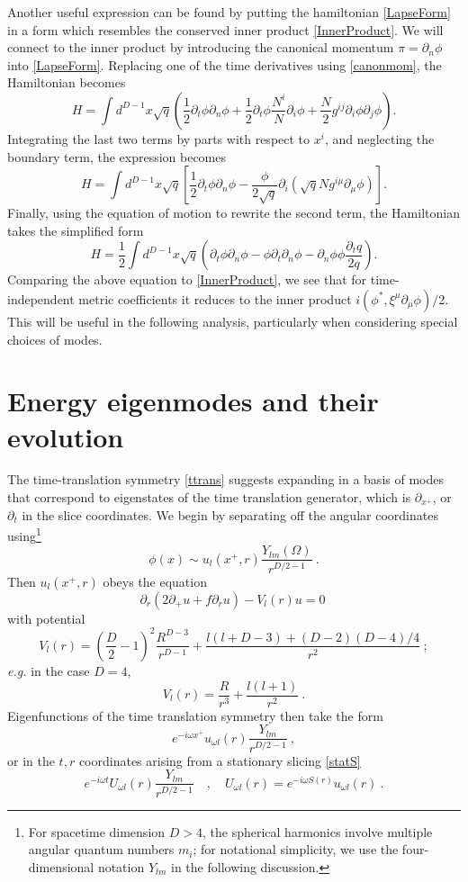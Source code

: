 \documentclass[11pt]{article}
\numberwithin{equation}{section}
\newcommand{\beq}{\begin{equation}}
\newcommand{\eeq}{\end{equation}}
\begin{document}
Another  useful expression can be found by putting the hamiltonian \eqref{LapseForm} in a form which resembles the conserved inner product \eqref{InnerProduct}. We will connect to the inner product by introducing the canonical momentum $\pi=\partial_n\phi$ into \eqref{LapseForm}. Replacing one of the time derivatives using \eqref{canonmom}, the Hamiltonian becomes
\beq
H= \int d^{D-1}x \sqrt{q}
\left(\frac{1}{2}\partial_t \phi \partial_n\phi + \frac{1}{2}\partial_t\phi\frac{N^i}{N}\partial_i  \phi  +\frac{N}{2}g^{ij} \partial_i \phi \partial_j \phi \right).
\eeq 
Integrating the last two terms by parts with respect to  $x^i$, and neglecting the boundary term, the expression becomes
\beq
H= \int d^{D-1}x \sqrt{q} \left[\frac{1}{2}\partial_t \phi \partial_n\phi -\frac{\phi}{2\sqrt{q}} \partial_i \left(\sqrt{q} N g^{i \mu} \partial_{\mu} \phi \right)\right].
\eeq 
Finally, using the equation of motion to rewrite the second term, the Hamiltonian takes the simplified form
\beq\label{IPform}
H= \frac{1}{2} \int d^{D-1}x \sqrt{q} \left(\partial_t \phi \partial_n\phi -\phi \partial_t \partial_n \phi -\partial_n\phi \phi \frac{\partial_t q}{2q} \right).
\eeq 
Comparing the above equation to \eqref{InnerProduct}, we see that for time-independent metric coefficients it reduces to the inner product $i(\phi^*,\xi^\mu\partial_\mu \phi)/2$.  This will be useful in the following analysis, particularly when considering special choices of modes.

\section{Energy eigenmodes and their evolution}\label{EnergyEmodes}

The time-translation symmetry \eqref{ttrans} suggests expanding in a basis of modes that correspond to eigenstates of the time translation generator, which is  $\partial_{x^+}$, or $\partial_t$ in the slice coordinates. We begin by separating off the angular coordinates using\footnote{For spacetime dimension $D>4$, the spherical harmonics involve multiple angular quantum numbers $m_i$; for notational simplicity, we use the four-dimensional notation $Y_{lm}$ in the following discussion.}
\beq\label{phisep}
\phi(x)\sim u_{l}(x^+,r) \frac{Y_{lm}(\Omega)}{r^{D/2-1}}\ .
\eeq
Then $u_{l}(x^+,r)$ obeys the equation
\beq\label{rxpeq}
\partial_r\left(2\partial_+ u + f\partial_r u\right) - V_l(r)u =0\ 
\eeq
with potential
\beq
V_l(r)= \left(\frac{D}{2}-1\right)^2 \frac{R^{D-3}}{r^{D-1}} +\frac{l(l+D-3)+(D-2)(D-4)/4}{r^{2}}\ ;
\eeq
{\it e.g.} in the case $D=4$, 
\beq\label{4dpot}
V_l(r) = \frac{R}{r^3} + \frac{l(l+1)}{r^2}\ .
\eeq
Eigenfunctions of the time translation symmetry then take the form
\beq\label{Eefcns}
e^{-i\omega x^+}u_{\omega l }(r) \frac{Y_{lm}}{r^{D/2-1}}\ ,
\eeq
or in the $t,r$ coordinates arising from a stationary slicing \eqref{statS}
\beq\label{Trsolns}
e^{-i\omega t}U_{\omega l}(r) \frac{Y_{lm}}{r^{D/2-1}}\quad ,\quad U_{\omega l}(r)= e^{-i\omega S(r)}u_{\omega l}(r)\ .
\eeq
\end{document}
